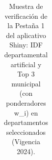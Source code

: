 \documentclass[
  10pt,
  letterpaper,
  DIV=11,
  numbers=noendperiod]{scrartcl}
\begin{document}
\begin{longtable}[]{@{}
  >{\raggedright\arraybackslash}p{}
  >{\raggedleft\arraybackslash}p{}
  >{\centering\arraybackslash}p{}
  >{\centering\arraybackslash}p{}
  >{\raggedright\arraybackslash}p{}
  >{\raggedleft\arraybackslash}p{}
  >{\raggedleft\arraybackslash}p{}@{}}

\caption{\label{tbl-top3-shiny-muestra}Muestra de verificación de la
Pestaña 1 del aplicativo Shiny: IDF departamental artificial y Top 3
municipal (con ponderadores w\_i) en departamentos seleccionados
(Vigencia 2024).}

\tabularnewline


\end{longtable}
\end{document}
